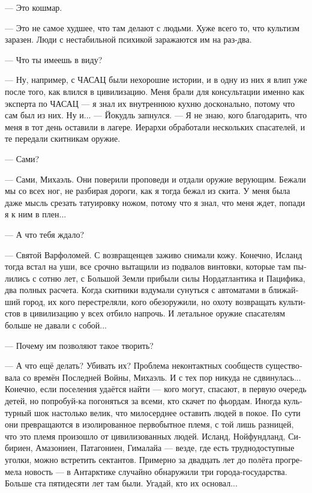 \documentclass[a4paper,12pt,fleqn]{book}\usepackage{polyglossia}\setdefaultlanguage[babelshorthands=true]{russian}\setotherlanguage{english}\defaultfontfeatures{Ligatures=TeX,Mapping=tex-text}\usepackage{xcolor}\newcommand{\ml}[3]{#2}
\begin{document}
--- Это кошмар.

--- Это не самое худшее, что там делают с людьми.
Хуже всего то, что культизм заразен.
Люди с нестабильной психикой заражаются им на раз-два.

--- Что ты имеешь в виду?

--- Ну, например, с ЧАСАЦ были нехорошие истории, и в одну из них я влип уже после того, как влился в цивилизацию.
Меня брали для консультации именно как эксперта по ЧАСАЦ --- я знал их внутреннюю кухню досконально, потому что сам был из них.
Ну и... --- Йокудль запнулся.
--- Я не знаю, кого благодарить, что меня в тот день оставили в лагере.
Иерархи обработали нескольких спасателей, и те передали скитникам оружие.

--- Сами?

--- Сами, Михаэль.
Они поверили проповеди и отдали оружие верующим.
Бежали мы со всех ног, не разбирая дороги, как я тогда бежал из скита.
У меня была даже мысль срезать татуировку ножом, потому что я знал, что меня ждет, попади я к ним в плен...

--- А что тебя ждало?

\ml{$0$}
{--- Святой Варфоломей.}
{``\textit{Sankt-Bartholomäus}.}
\ml{$0$}
{С возвращенцев заживо снимали кожу.}
{Backsliders are to be skinned alive.}
Конечно, Исланд тогда встал на уши, все срочно вытащили из подвалов винтовки, которые там пылились с сотню лет, с Большой Земли прибыли силы Нордатлантика и Пацифика, два полных расчета.
Когда скитники вздумали сунуться с автоматами в ближайший город, их кого перестреляли, кого обезоружили, но охоту возвращать культистов в цивилизацию у всех отбило напрочь.
И летальное оружие спасателям больше не давали с собой...

--- Почему им позволяют такое творить?

--- А что ещё делать?
Убивать их?
Проблема неконтактных сообществ существовала со времён Последней Войны, Михаэль.
И с тех пор никуда не сдвинулась...
Конечно, если поселения удаётся найти --- кого могут, спасают, в первую очередь детей, но попробуй-ка погоняться за всеми, кто скачет по фьордам.
Иногда культурный шок настолько велик, что милосерднее оставить людей в покое.
По сути они превращаются в изолированное первобытное племя, с той лишь разницей, что это племя произошло от цивилизованных людей.
Исланд, Нойфундланд, Сибириен, Амазониен, Патагониен, Гималайа --- везде, где есть труднодоступные уголки, можно встретить сектантов.
Примерно за двадцать лет до полёта прогремела новость --- в Антарктике случайно обнаружили три города-государства.
Больше ста пятидесяти лет там были.
Угадай, кто их основал...
\end{document}
